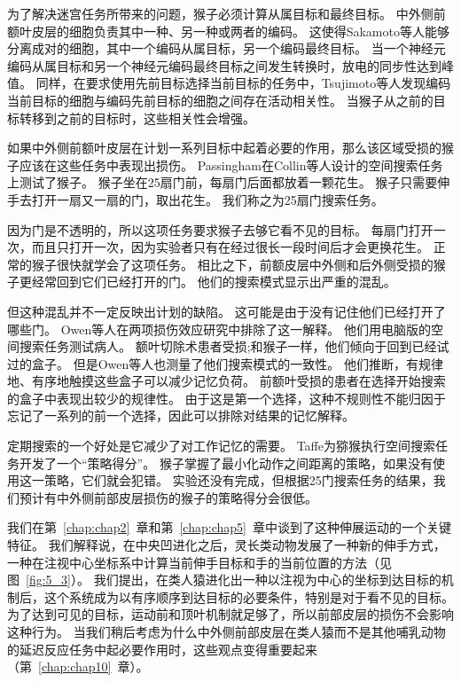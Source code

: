 为了解决迷宫任务所带来的问题，猴子必须计算从属目标和最终目标。
中外侧前额叶皮层的细胞负责其中一种、另一种或两者的编码\cite{saito2005representation}。
这使得Sakamoto等人\cite{sakamoto2008discharge}能够分离成对的细胞，其中一个编码从属目标，另一个编码最终目标。
当一个神经元编码从属目标和另一个神经元编码最终目标之间发生转换时，放电的同步性达到峰值。
同样，在要求使用先前目标选择当前目标的任务中，Tsujimoto等人\cite{tsujimoto2008transient}发现编码当前目标的细胞与编码先前目标的细胞之间存在活动相关性。
当猴子从之前的目标转移到之前的目标时，这些相关性会增强。


如果中外侧前额叶皮层在计划一系列目标中起着必要的作用，那么该区域受损的猴子应该在这些任务中表现出损伤。
Passingham\cite{passingham1985memory}在Collin等人\cite{collin1982role}设计的空间搜索任务上测试了猴子。
猴子坐在25扇门前，每扇门后面都放着一颗花生。
猴子只需要伸手去打开一扇又一扇的门，取出花生。
我们称之为25扇门搜索任务。


因为门是不透明的，所以这项任务要求猴子去够它看不见的目标。
每扇门打开一次，而且只打开一次，因为实验者只有在经过很长一段时间后才会更换花生。
正常的猴子很快就学会了这项任务。
相比之下，前额皮层中外侧和后外侧受损的猴子更经常回到它们已经打开的门。
他们的搜索模式显示出严重的混乱。


但这种混乱并不一定反映出计划的缺陷。
这可能是由于没有记住他们已经打开了哪些门。
Owen等人在两项损伤效应研究中排除了这一解释。
他们用电脑版的空间搜索任务测试病人。
额叶切除术患者受损;和猴子一样，他们倾向于回到已经试过的盒子。
但是Owen等人也测量了他们搜索模式的一致性。
他们推断，有规律地、有序地触摸这些盒子可以减少记忆负荷。
前额叶受损的患者在选择开始搜索的盒子中表现出较少的规律性。
由于这是第一个选择，这种不规则性不能归因于忘记了一系列的前一个选择，因此可以排除对结果的记忆解释。


定期搜索的一个好处是它减少了对工作记忆的需要。
Taffe\cite{taffe2011rhesus}为猕猴执行空间搜索任务开发了一个“策略得分”。
猴子掌握了最小化动作之间距离的策略，如果没有使用这一策略，它们就会犯错。
实验还没有完成，但根据25门搜索任务的结果，我们预计有中外侧前部皮层损伤的猴子的策略得分会很低。


我们在第~\ref{chap:chap2}~章和第~\ref{chap:chap5}~章中谈到了这种伸展运动的一个关键特征。
我们解释说，在中央凹进化之后，灵长类动物发展了一种新的伸手方式，一种在注视中心坐标系中计算当前伸手目标和手的当前位置的方法（见图~\ref{fig:5_3}）。
我们提出，在类人猿进化出一种以注视为中心的坐标到达目标的机制后，这个系统成为以有序顺序到达目标的必要条件，特别是对于看不见的目标。
为了达到可见的目标，运动前和顶叶机制就足够了，所以前部皮层的损伤不会影响这种行为。
当我们稍后考虑为什么中外侧前部皮层在类人猿而不是其他哺乳动物的延迟反应任务中起必要作用时，这些观点变得重要起来（第~\ref{chap:chap10}~章）。



